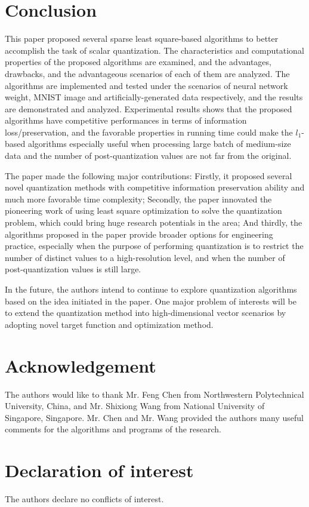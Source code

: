 \documentclass[preprint,10pt]{elsarticle}
\begin{document}
\section{Conclusion}
This paper proposed several sparse least square-based algorithms to better accomplish the task of scalar quantization. The characteristics and computational properties of the proposed algorithms are examined, and the advantages, drawbacks, and the advantageous scenarios of each of them are analyzed. The algorithms are implemented and tested under the scenarios of neural network weight, MNIST image and artificially-generated data respectively, and the results are demonstrated and analyzed. Experimental results shows that the proposed algorithms have competitive performances in terms of information loss/preservation, and the favorable properties in running time could make the $l_1$-based algorithms especially useful when processing large batch of medium-size data and the number of post-quantization values are not far from the original. \par
The paper made the following major contributions: Firstly, it proposed several novel quantization methods with competitive information preservation ability and much more favorable time complexity; Secondly, the paper innovated the pioneering work of using least square optimization to solve the quantization problem, which could bring huge research potentials in the area; And thirdly, the algorithms proposed in the paper provide broader options for engineering practice, especially when the purpose of performing quantization is to restrict the number of distinct values to a high-resolution level, and when the number of post-quantization values is still large. \par
In the future, the authors intend to continue to explore quantization algorithms based on the idea initiated in the paper. One major problem of interests will be to extend the quantization method into high-dimensional vector scenarios by adopting novel target function and optimization method.
\section{Acknowledgement}
The authors would like to thank Mr. Feng Chen from Northwestern Polytechnical University, China, and Mr. Shixiong Wang from National University of Singapore, Singapore. Mr. Chen and Mr. Wang provided the authors many useful comments for the algorithms and programs of the research.
\section{Declaration of interest}
The authors declare no conflicts of interest.
\clearpage



\end{document}
